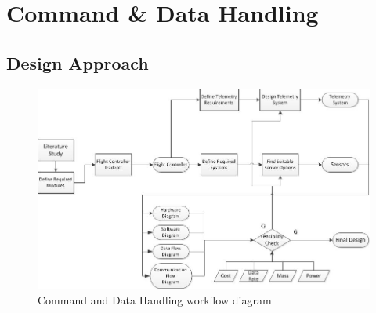 \chapter{Command \& Data Handling}%
\setlength{\parindent}{15pt}
\label{ch:avio_grou_hand}


 
\section{Design Approach}

\begin{figure}[htb]
    \centering
    \includegraphics[width=\textwidth]{./CommandDataHandling/Figures/WorkFlow}
    \caption{Command and Data Handling workflow diagram}
    \label{fig:comm_data_work}
\end{figure}



